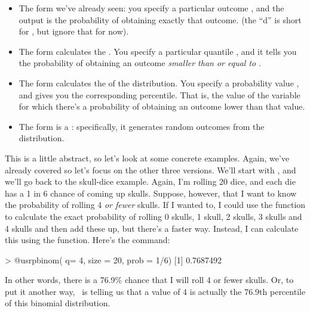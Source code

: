 \begin{itemize}
\item The  form we've already seen: you specify a particular outcome , and the output is the probability of obtaining exactly that outcome. (the ``d'' is short for , but ignore that for now).
\item The  form calculates the . You specify a particular quantile , and it tells you the probability of obtaining an outcome {\it smaller than or equal to} . 
\item The  form calculates the  of the distribution. You specify a probability value , and gives you the corresponding percentile. That is, the value of the variable for which there's a probability  of obtaining an outcome lower than that value.
\item The  form is a : specifically, it generates  random outcomes from the distribution.
\end{itemize}

\noindent
This is a little abstract, so let's look at some concrete examples. Again, we've already covered  so let's focus on the other three versions. We'll start with , and we'll go back to the skull-dice example. Again, I'm rolling 20 dice, and each die has a 1 in 6 chance of coming up skulls. Suppose, however, that I want to know the probability of rolling 4 {\it or fewer} skulls. If I wanted to, I could use the  function to calculate the exact probability of rolling 0 skulls, 1 skull, 2 skulls, 3 skulls and 4 skulls and then add these up, but there's a faster way. Instead, I can calculate this using the  function. Here's the command:
\begin{rblock1}
> @usr{pbinom( q= 4, size = 20, prob = 1/6)}
[1] 0.7687492
\end{rblock1}
In other words, there is a 76.9\% chance that I will roll 4 or fewer skulls. Or, to put it another way, \R\ is telling us that a value of 4 is actually the 76.9th percentile of this binomial distribution.


